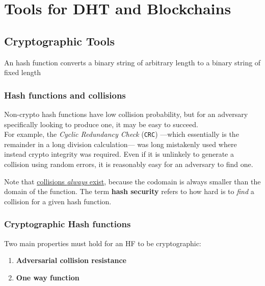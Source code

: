 \chapter{Tools for DHT and Blockchains}
\section{Cryptographic Tools}
\begin{definition}
   An hash function converts a binary string of arbitrary length to a binary string of fixed length
\end{definition}

\subsection{Hash functions and collisions}
Non-crypto hash functions have low collision probability, but for an adversary specifically looking to produce one, it may be easy to succeed.\\
For example, the \textit{Cyclic Redundancy Check} (\texttt{CRC}) ---which essentially is the remainder in a long division calculation--- was long mistakenly used where instead crypto integrity was required.
Even if it is unlinkely to generate a collision using random errors, it is reasonably easy for an adversary to find one. 

Note that \ul{collisions \textit{always} exist}, because the codomain is always smaller than the domain of the function.
The term \textbf{hash security} refers to how hard is to \textit{find} a collision for a given hash function.

\subsection{Cryptographic Hash functions}
{Two main properties must hold for an HF to be cryptographic:\ns
\begin{enumerate}
   \item \textbf{Adversarial collision resistance}
   \item \textbf{One way function}
\end{enumerate}}

